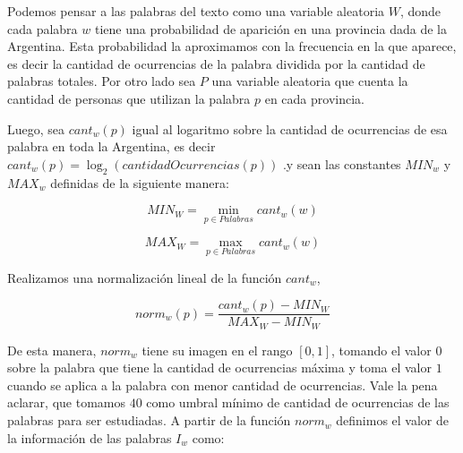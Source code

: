 Podemos pensar a las palabras del texto como una variable aleatoria $W$, donde cada palabra $w$ tiene una probabilidad de aparición en una provincia dada de la Argentina. Esta probabilidad la aproximamos con la frecuencia en la que aparece, es decir la cantidad de ocurrencias de la palabra dividida por la cantidad de palabras totales.
Por otro lado sea $P$ una variable aleatoria que cuenta la cantidad de personas que 
utilizan la palabra $p$ en cada provincia.

\medskip

Luego, sea $cant_w(p)$ igual al logaritmo sobre la cantidad de ocurrencias de esa palabra en toda la Argentina, es decir $cant_w(p) = \log_2(cantidadOcurrencias(p))$ .y sean las constantes $MIN_w$ y $MAX_w$ definidas de la siguiente manera:



\begin{equation}
MIN_W = \min\limits_{p \in Palabras} cant_w(w)
\end{equation}

\begin{equation}
  MAX_W = \max\limits_{p \in Palabras} cant_w(w)
\end{equation}

Realizamos una normalización lineal de la función $cant_w$, 

\begin{equation}
norm_{w}(p) = \frac{cant_w(p)- MIN_W }{MAX_W - MIN_W}
\label{eq:norm1}
\end{equation}

De esta manera, $norm_w$ tiene su imagen en el rango $[0,1]$, tomando el valor $0$ sobre la palabra que tiene la cantidad de ocurrencias máxima y toma el valor $1$ cuando se aplica a la palabra con menor cantidad de ocurrencias. Vale la pena aclarar, que tomamos $40$ como umbral mínimo de cantidad de ocurrencias de las palabras para ser estudiadas.
A partir de la función $norm_w$ definimos el valor de la información de las palabras $I_w$ como:

